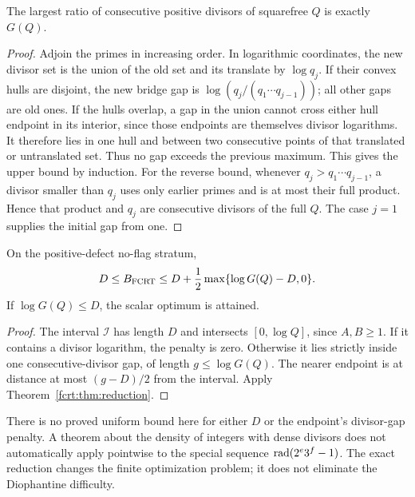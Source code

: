 \begin{lemma}\label{fcrt:lem:dense}
The largest ratio of consecutive positive divisors of squarefree \(Q\)
is exactly \(G(Q)\).
\end{lemma}
\begin{proof}
Adjoin the primes in increasing order. In logarithmic coordinates, the new
divisor set is the union of the old set and its translate by \(\log q_j\).
If their convex hulls are disjoint, the new bridge gap is
\(\log(q_j/(q_1\cdots q_{j-1}))\); all other gaps are old ones. If the
hulls overlap, a gap in the union cannot cross either hull endpoint in its
interior, since those endpoints are themselves divisor logarithms. It therefore
lies in one hull and between two consecutive points of that translated or
untranslated set. Thus no gap exceeds the previous maximum.
This gives the upper bound by induction.
For the reverse bound, whenever \(q_j>q_1\cdots q_{j-1}\), a divisor
smaller than \(q_j\) uses only earlier primes and is at most their full
product. Hence that product and \(q_j\) are consecutive divisors of the
full \(Q\). The case \(j=1\) supplies the initial gap from one.
\end{proof}

\begin{corollary}\label{fcrt:cor:densebound}
On the positive-defect no-flag stratum,
\[
 D\le B_{\mathrm{FCRT}}\le D+\frac12\max\{\log G(Q)-D,0\}.
\]
If \(\log G(Q)\le D\), the scalar optimum is attained.
\end{corollary}
\begin{proof}
The interval \(\mathcal I\) has length \(D\) and intersects
\([0,\log Q]\), since \(A,B\ge1\). If it contains a divisor logarithm,
the penalty is zero. Otherwise it lies strictly inside one consecutive-divisor
gap, of length \(g\le\log G(Q)\). The nearer endpoint is at distance at
most \((g-D)/2\) from the interval. Apply Theorem~\ref{fcrt:thm:reduction}.
\end{proof}

There is no proved uniform bound here for either \(D\) or the endpoint's
divisor-gap penalty. A theorem about the density of integers with dense
divisors does not automatically apply pointwise to the special sequence
\(\operatorname{rad}(2^e3^f-1)\). The exact reduction changes the finite optimization
problem; it does not eliminate the Diophantine difficulty.

